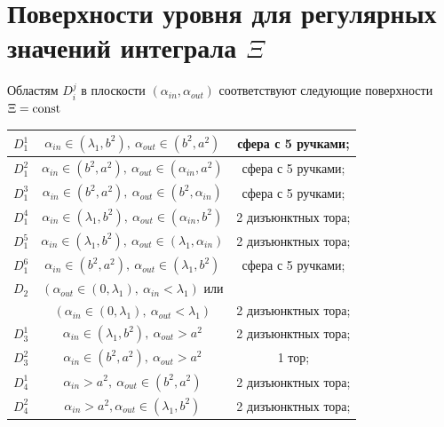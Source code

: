 \section{Поверхности уровня для регулярных значений интеграла $\Xi$}
\begin{theorem} 
Областям $D_i^j$ в плоскости $(\alpha_{in}, \alpha_{out})$ соответствуют следующие поверхности $\Xi = \mathrm{const}$
\medskip
\begin{center}
\begin{tabular}{|c|c|c|}
\hline 
$D_1^1$  	& 	$\alpha_{in} \in (\lambda_1, b^2), \ \alpha_{out} \in (b^2, a^2)$			& сфера с 5 ручками; \\ \hline 
$D_1^2$  	& 	$\alpha_{in} \in (b^2, a^2), \ \alpha_{out} \in (\alpha_{in}, a^2)$				& сфера с 5 ручками; \\ \hline 
$D_1^3$  	& 	$\alpha_{in} \in (b^2, a^2), \ \alpha_{out} \in (b^2, \alpha_{in})$				& сфера с 5 ручками; \\ \hline 
$D_1^4$ 	& 	$\alpha_{in} \in (\lambda_1, b^2), \ \alpha_{out} \in (\alpha_{in}, b^2)$	& 2 дизъюнктных тора; \\ \hline 
$D_1^5$  	& 	$\alpha_{in} \in (\lambda_1, b^2), \ \alpha_{out} \in (\lambda_1, \alpha_{in})$	& 2 дизъюнктных тора; \\ \hline 
$D_1^6$  	& 	$\alpha_{in} \in (b^2, a^2), \ \alpha_{out} \in (\lambda_1, b^2)$			& сфера с 5 ручками; \\ \hline 
\hline
$D_2$  	& 	$(\alpha_{out} \in (0, \lambda_1), \ \alpha_{in} < \lambda_1)$ или & \\
		&  $(\alpha_{in} \in (0, \lambda_1), \ \alpha_{out} < \lambda_1)$				& 2 дизъюнктных тора; \\ \hline
 \hline
$D_3^1$  	& 	$\alpha_{in} \in (\lambda_1, b^2), \ \alpha_{out} > a^2$				& 2 дизъюнктных тора; \\ \hline 
$D_3^2$  	& 	$\alpha_{in} \in (b^2, a^2), \ \alpha_{out} > a^2 $					& 1 тор; \\ \hline 
\hline 
$D_4^1$  	& 	$\alpha_{in} > a^2, \ \alpha_{out} \in (b^2, a^2)$						& 2 дизъюнктных тора; \\ \hline 
$D_4^2$  	& 	$\alpha_{in} > a^2, \alpha_{out} \in (\lambda_1, b^2)$				& 2 дизъюнктных тора; \\ \hline 
\end{tabular}
\end{center}
%
%

\end{theorem}
